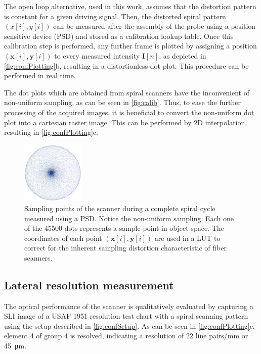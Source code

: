 \documentclass[10pt]{iopart}
\begin{document}
The open loop alternative, used in this work, assumes that the distortion pattern is constant for a given driving signal. Then, the distorted spiral pattern $(x[i], y[i])$ can be measured after the assembly of the probe using a position sensitive device (PSD) and stored as a calibration lookup table.
Once this calibration step is performed, any further frame is plotted by assigning a position $(\mathbf{x}[i], \mathbf{y}[i])$ to every measured intensity $\mathbf{I}[n]$, as depicted in \autoref{fig:confPlotting}b, resulting in a distortionless dot plot. This procedure can be performed in real time.

The dot plots which are obtained from spiral scanners have the inconvenient of non-uniform sampling, as can be seen in \autoref{fig:calib}. Thus, to ease the further processing of the acquired images, it is beneficial to convert the non-uniform dot plot into a cartesian raster image. This can be performed by 2D interpolation, resulting in \autoref{fig:confPlotting}c.


\begin{figure}[h!]\centering \includegraphics[width=3cm]{figures/samplingDensity.png}
      \caption{Sampling points of the scanner during a complete spiral cycle measured using a PSD. Notice the non-uniform sampling. Each one of the 45500 dots represents a sample point in object space. The coordinates of each point $(\mathbf{x}[i], \mathbf{y}[i])$ are used in a LUT to correct for the inherent sampling distortion characteristic of fiber scanners.}
      \label{fig:calib}
\end{figure}



\subsection{Lateral resolution measurement}
The optical performance of the scanner is qualitatively evaluated by capturing a SLI image of a USAF 1951 resolution test chart with a spiral scanning pattern using the setup described in \autoref{fig:confSetup}. As can be seen in \autoref{fig:confPlotting}c, element 4 of group 4 is resolved, indicating a resolution of 22 line pairs/mm or \SI{45}{\micro\meter}. 
\end{document}
